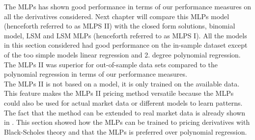 The MLPs has shown good performance in terms of our performance measures on all the derivatives considered. Next chapter will compare this MLPs model (henceforth referred to as MLPS II) with the closed form solutions, binomial model, LSM and LSM MLPs (henceforth referred to as MLPS I). All the models in this section considered had good performance on the in-sample dataset except of the too simple models linear regression and 2. degree polynomial regression. The MLPs II was superior for out-of-sample data sets compared to the polynomial regression in terms of our performance measures.\\

The MLPs II is not based on a model, it is only trained on the available data. This feature makes the MLPs II pricing method versatile because the MLPs could also be used for actual market data or different models to learn patterns. The fact that the method can be extended to real market data is already shown in \parencite{GasparRaquel20}. This section showed how the MLPs can be trained to pricing derivatives with Black-Scholes theory and that the MLPs is preferred over polynomial regression.









